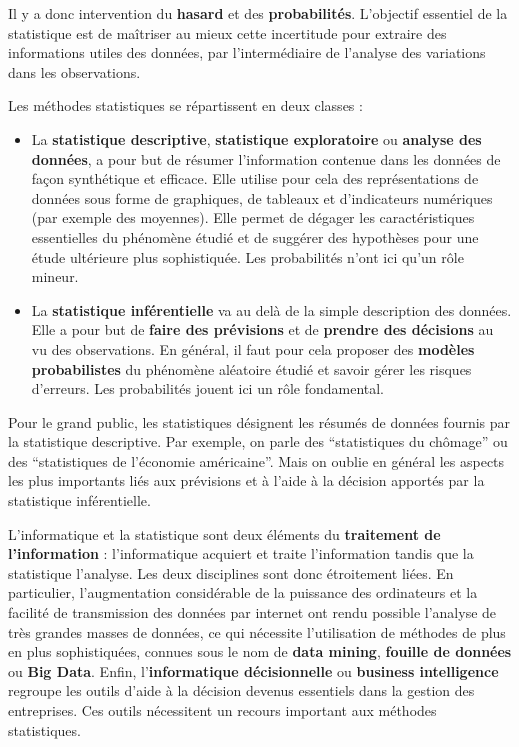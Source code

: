 \documentclass[]{book}
\providecommand{\tightlist}{%
  \setlength{\itemsep}{0pt}\setlength{\parskip}{0pt}}
\theoremstyle{magentacolor}
\theoremstyle{proprie}
\theoremstyle{exstyle}
\theoremstyle{exostyle}
\theoremstyle{definition}
\theoremstyle{definition}
\theoremstyle{definition}
\theoremstyle{remark}
\begin{document}
Il y a donc intervention du \textbf{hasard} et des \textbf{probabilités}. L'objectif essentiel de la statistique est de maîtriser au mieux cette incertitude pour extraire des informations utiles des données, par l'intermédiaire de l'analyse des variations dans les observations.

Les méthodes statistiques se répartissent en deux classes :

\begin{itemize}
\tightlist
\item
  La \textbf{statistique descriptive}, \textbf{statistique exploratoire} ou \textbf{analyse des données}, a pour but de résumer l'information contenue dans les données de façon synthétique et efficace. Elle utilise pour cela des représentations de données sous forme de graphiques, de tableaux et d'indicateurs numériques (par exemple des moyennes). Elle permet de dégager les caractéristiques essentielles du phénomène étudié et de suggérer des hypothèses pour une étude ultérieure plus sophistiquée. Les probabilités n'ont ici qu'un rôle mineur.
\item
  La \textbf{statistique inférentielle} va au delà de la simple description des données. Elle a pour but de \textbf{faire des prévisions} et de \textbf{prendre des décisions} au vu des observations. En général, il faut pour cela proposer des \textbf{modèles probabilistes} du phénomène aléatoire étudié et savoir gérer les risques d'erreurs. Les probabilités jouent ici un rôle fondamental.
\end{itemize}

Pour le grand public, les statistiques désignent les résumés de données fournis par la statistique descriptive. Par exemple, on parle des ``statistiques du chômage'' ou des ``statistiques de l'économie américaine''. Mais on oublie en général les aspects les plus importants liés aux prévisions et à l'aide à la décision apportés par la statistique inférentielle.

L'informatique et la statistique sont deux éléments du \textbf{traitement de l'information} : l'informatique acquiert et traite l'information tandis que la statistique l'analyse. Les deux disciplines sont donc étroitement liées. En particulier, l'augmentation considérable de la puissance des ordinateurs et la facilité de transmission des données par internet ont rendu possible l'analyse de très grandes masses de données, ce qui nécessite l'utilisation de méthodes de plus en plus sophistiquées, connues sous le nom de \textbf{data mining}, \textbf{fouille de données} ou \textbf{Big Data}. Enfin, l'\textbf{informatique décisionnelle} ou \textbf{business intelligence} regroupe les outils d'aide à la décision devenus essentiels dans la gestion des entreprises. Ces outils nécessitent un recours important aux méthodes statistiques.
\end{document}
